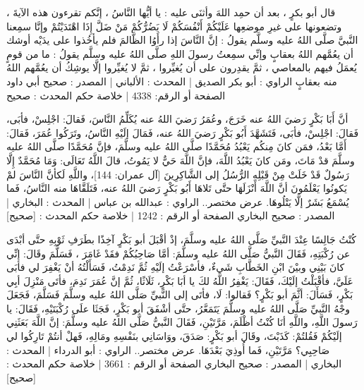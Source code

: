 قال أبو بكرٍ ، بعد أن حمِد اللهَ وأثنَى عليه : يا أيُّها النَّاسُ ، إنَّكم تقرءون هذه الآيةَ ، وتضعونها على غيرِ موضعِها عَلَيْكُمْ أَنْفُسَكُمْ لَا يَضُرُّكُمْ مَنْ ضَلَّ إِذَا اهْتَدَيْتُمْ وإنَّا سمِعنا النَّبيَّ صلَّى اللهُ عليه وسلَّم يقولُ : إنَّ النَّاسَ إذا رأَوُا الظَّالمَ فلم يأخُذوا على يدَيْه أوشك أن يعُمَّهم اللهُ بعقابٍ وإنِّي سمِعتُ رسولَ اللهِ صلَّى اللهُ عليه وسلَّم يقولُ : ما من قومٍ يُعمَلُ فيهم بالمعاصي ، ثمَّ يقدِرون على أن يُغيِّروا ، ثمَّ لا يُغيِّروا إلَّا يوشِكُ أن يعُمَّهم اللهُ منه بعقابٍ
الراوي : أبو بكر الصديق | المحدث : الألباني | المصدر : صحيح أبي داود
الصفحة أو الرقم: 4338 | خلاصة حكم المحدث : صحيح


أنَّ أَبَا بَكْرٍ رَضيَ اللهُ عنه خَرَجَ، وعُمَرُ رَضيَ اللهُ عنه يُكَلِّمُ النَّاسَ، فَقالَ: اجْلِسْ، فأبَى، فَقالَ: اجْلِسْ، فأبَى، فَتَشَهَّدَ أَبُو بَكْرٍ رَضيَ اللهُ عنه، فَمَالَ إلَيْهِ النَّاسُ، وتَرَكُوا عُمَرَ، فَقالَ: أَمَّا بَعْدُ، فمَن كانَ مِنكُم يَعْبُدُ مُحَمَّدًا صلَّى اللهُ عليه وسلَّمَ، فإنَّ مُحَمَّدًا صلَّى اللهُ عليه وسلَّمَ قدْ مَاتَ، ومَن كانَ يَعْبُدُ اللَّهَ، فإنَّ اللَّهَ حَيٌّ لا يَمُوتُ، قالَ اللَّهُ تَعَالَى: {وَمَا مُحَمَّدٌ إِلَّا رَسُولٌ قَدْ خَلَتْ مِنْ قَبْلِهِ الرُّسُلُ} إلى {الشَّاكِرِينَ} [آل عمران: 144]، واللَّهِ لَكأنَّ النَّاسَ لمْ يَكونُوا يَعْلَمُونَ أنَّ اللَّهَ أَنْزَلَهَا حتَّى تَلاهَا أَبُو بَكْرٍ رَضيَ اللهُ عنه، فَتَلَقَّاهَا منه النَّاسُ، فَما يُسْمَعُ بَشَرٌ إلَّا يَتْلُوهَا.
عرض مختصر..
الراوي : عبدالله بن عباس | المحدث : البخاري | المصدر : صحيح البخاري
الصفحة أو الرقم : 1242 | خلاصة حكم المحدث : [صحيح] 

كُنْتُ جَالِسًا عِنْدَ النَّبيِّ صَلَّى اللهُ عليه وسلَّمَ، إذْ أقْبَلَ أبو بَكْرٍ آخِذًا بطَرَفِ ثَوْبِهِ حتَّى أبْدَى عن رُكْبَتِهِ، فَقَالَ النَّبيُّ صَلَّى اللهُ عليه وسلَّمَ: أمَّا صَاحِبُكُمْ فقَدْ غَامَرَ ، فَسَلَّمَ وقَالَ: إنِّي كانَ بَيْنِي وبيْنَ ابْنِ الخَطَّابِ شَيءٌ، فأسْرَعْتُ إلَيْهِ ثُمَّ نَدِمْتُ، فَسَأَلْتُهُ أنْ يَغْفِرَ لي فأبَى عَلَيَّ، فأقْبَلْتُ إلَيْكَ، فَقَالَ: يَغْفِرُ اللَّهُ لكَ يا أبَا بَكْرٍ، ثَلَاثًا، ثُمَّ إنَّ عُمَرَ نَدِمَ، فأتَى مَنْزِلَ أبِي بَكْرٍ، فَسَأَلَ: أثَّمَ أبو بَكْرٍ؟ فَقالوا: لَا، فأتَى إلى النَّبيِّ صَلَّى اللهُ عليه وسلَّمَ فَسَلَّمَ، فَجَعَلَ وجْهُ النَّبيِّ صَلَّى اللهُ عليه وسلَّمَ يَتَمَعَّرُ، حتَّى أشْفَقَ أبو بَكْرٍ، فَجَثَا علَى رُكْبَتَيْهِ، فَقَالَ: يا رَسولَ اللَّهِ، واللَّهِ أنَا كُنْتُ أظْلَمَ، مَرَّتَيْنِ، فَقَالَ النَّبيُّ صَلَّى اللهُ عليه وسلَّمَ: إنَّ اللَّهَ بَعَثَنِي إلَيْكُمْ فَقُلتُمْ: كَذَبْتَ، وقَالَ أبو بَكْرٍ: صَدَقَ، ووَاسَانِي بنَفْسِهِ ومَالِهِ، فَهلْ أنتُمْ تَارِكُوا لي صَاحِبِي؟ مَرَّتَيْنِ، فَما أُوذِيَ بَعْدَهَا.
عرض مختصر..
الراوي : أبو الدرداء | المحدث : البخاري | المصدر : صحيح البخاري
الصفحة أو الرقم : 3661 | خلاصة حكم المحدث : [صحيح]

